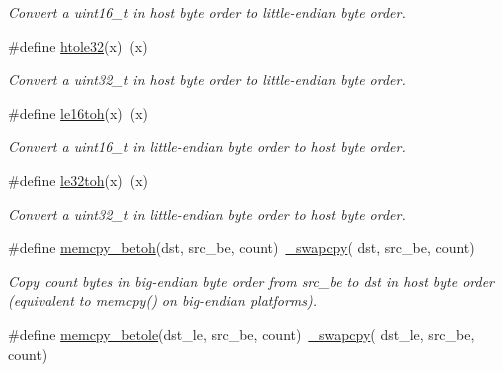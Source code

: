 \begin{DoxyCompactItemize}
\begin{DoxyCompactList}\small\item\em Convert a uint16\-\_\-t in host byte order to little-\/endian byte order. \end{DoxyCompactList}\item 
\hypertarget{group__util__byteorder_ga9bea1e76e277f13ae39ac86095510bfa}{\#define \hyperlink{group__util__byteorder_ga9bea1e76e277f13ae39ac86095510bfa}{htole32}(x)~(x)}\label{group__util__byteorder_ga9bea1e76e277f13ae39ac86095510bfa}

\begin{DoxyCompactList}\small\item\em Convert a uint32\-\_\-t in host byte order to little-\/endian byte order. \end{DoxyCompactList}\item 
\hypertarget{group__util__byteorder_ga684a5d26d1989cbd925e97292cc81c72}{\#define \hyperlink{group__util__byteorder_ga684a5d26d1989cbd925e97292cc81c72}{le16toh}(x)~(x)}\label{group__util__byteorder_ga684a5d26d1989cbd925e97292cc81c72}

\begin{DoxyCompactList}\small\item\em Convert a uint16\-\_\-t in little-\/endian byte order to host byte order. \end{DoxyCompactList}\item 
\hypertarget{group__util__byteorder_gad2dfbafcefb3add65ea44e581398e90a}{\#define \hyperlink{group__util__byteorder_gad2dfbafcefb3add65ea44e581398e90a}{le32toh}(x)~(x)}\label{group__util__byteorder_gad2dfbafcefb3add65ea44e581398e90a}

\begin{DoxyCompactList}\small\item\em Convert a uint32\-\_\-t in little-\/endian byte order to host byte order. \end{DoxyCompactList}\item 
\hypertarget{group__util__byteorder_gad871f144718432cb04f76e79aec80c87}{\#define \hyperlink{group__util__byteorder_gad871f144718432cb04f76e79aec80c87}{memcpy\-\_\-betoh}(dst, src\-\_\-be, count)~\hyperlink{group__util__byteorder_ga23fd4d4005a80a26ff3c6ba23a4af560}{\-\_\-swapcpy}( dst, src\-\_\-be, count)}\label{group__util__byteorder_gad871f144718432cb04f76e79aec80c87}

\begin{DoxyCompactList}\small\item\em Copy {\itshape count} bytes in big-\/endian byte order from {\itshape src\-\_\-be} to {\itshape dst} in host byte order (equivalent to memcpy() on big-\/endian platforms). \end{DoxyCompactList}\item 
\hypertarget{group__util__byteorder_ga75cf1250c9f15ea3f0d87250c2b43a51}{\#define \hyperlink{group__util__byteorder_ga75cf1250c9f15ea3f0d87250c2b43a51}{memcpy\-\_\-betole}(dst\-\_\-le, src\-\_\-be, count)~\hyperlink{group__util__byteorder_ga23fd4d4005a80a26ff3c6ba23a4af560}{\-\_\-swapcpy}( dst\-\_\-le, src\-\_\-be, count)}\label{group__util__byteorder_ga75cf1250c9f15ea3f0d87250c2b43a51}


\end{DoxyCompactItemize}
